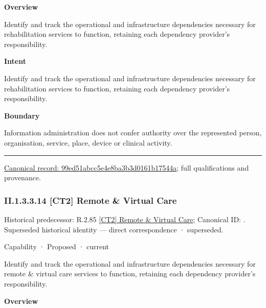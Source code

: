 \textbf{Overview}



Identify and track the operational and infrastructure dependencies necessary for rehabilitation services to function, retaining each dependency provider's responsibility.



\textbf{Intent}



Identify and track the operational and infrastructure dependencies necessary for rehabilitation services to function, retaining each dependency provider's responsibility.



\textbf{Boundary}



Information administration does not confer authority over the represented person, organisation, service, place, device or clinical activity.



\medskip\hrule\medskip

{\footnotesize \href{../../../../continuum/strategy/capability/99ed51abcc5e4e8ba3b3d0161b17544a.md}{Canonical record: 99ed51abcc5e4e8ba3b3d0161b17544a}; full qualifications and provenance.}\par
\subsubsection*{II.1.3.3.14 [CT2] Remote \& Virtual Care}
\label{navigation:II.1.3.3.14}

{\small Historical predecessor: R.2.85 \hyperref[element:75e2b447659c4fdf94107d94758337ed]{[CT2] Remote \& Virtual Care}; Canonical ID: \texttt{}. Superseded historical identity — direct correspondence · superseded.}\par
\label{element:30dff22d40b64da29ede7c41673db085}
{\small Capability · Proposed · current}\par

Identify and track the operational and infrastructure dependencies necessary for remote \& virtual care services to function, retaining each dependency provider's responsibility.



\textbf{Overview}



